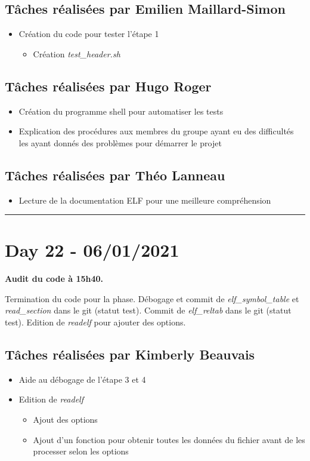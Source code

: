 \documentclass[11pt,letterpaper]{article}
\begin{document}
\subsection*{Tâches réalisées par Emilien Maillard-Simon}
\begin{itemize}
    \item Création du code pour tester l'étape 1
    \begin{itemize}
        \item Création \textit{test\_header.sh} 
    \end{itemize} 
\end{itemize}

\subsection*{Tâches réalisées par Hugo Roger}
\begin{itemize}
    \item Création du programme shell pour automatiser les tests
    \item Explication des procédures aux membres du groupe ayant 
    eu des difficultés les ayant donnés des problèmes pour démarrer le projet
\end{itemize}

\subsection*{Tâches réalisées par Théo Lanneau}
\begin{itemize}
    \item Lecture de la documentation ELF pour une meilleure compréhension 
\end{itemize}

\noindent\rule{13cm}{0.4pt}

\section*{Day 22 - 06/01/2021}
\textbf{Audit du code à 15h40.}

\noindent Termination du code pour la phase.
Débogage et commit de \textit{elf\_symbol\_table} et \textit{read\_section} 
dans le git (statut test). Commit de \textit{elf\_reltab} dans le git (statut 
test). Edition de \textit{readelf} pour ajouter des options. 

\subsection*{Tâches réalisées par Kimberly Beauvais}
\begin{itemize}
    \item Aide au débogage de l'étape 3 et 4
    \item Edition de \textit{readelf}
    \begin{itemize}
        \item Ajout des options
        \item Ajout d'un fonction pour obtenir toutes les données du fichier avant 
        de les processer selon les options
    \end{itemize}
\end{itemize}
\end{document}
